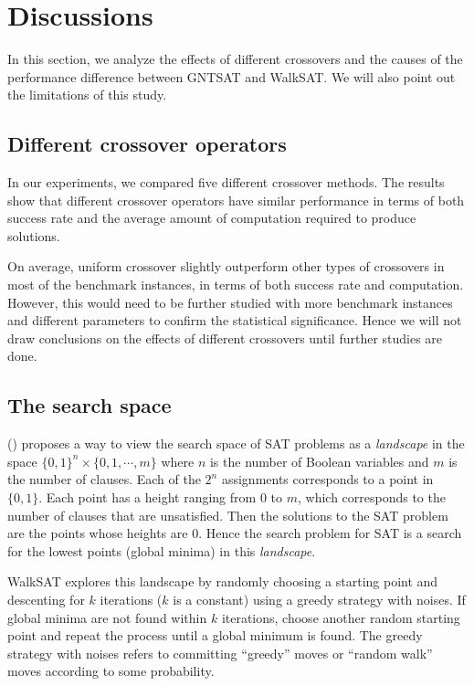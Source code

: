 \section{Discussions}
In this section, we analyze the effects of different crossovers and the causes
of the performance difference between GNTSAT and WalkSAT. We will also point
out the limitations of this study.

\subsection{Different crossover operators}
In our experiments, we compared five different crossover methods. The results
show that different crossover operators have similar performance in terms of
both success rate and the average amount of computation required to produce
solutions.

On average, uniform crossover slightly outperform other types of crossovers in
most of the benchmark instances, in terms of both success rate and
computation. However, this would need to be further studied with more
benchmark instances and different parameters to confirm the statistical
significance. Hence we will not draw conclusions on the effects of different
crossovers until further studies are done.

\subsection{The search space}
\citeauthor{biere2009handbook} (\citeyear{biere2009handbook}) proposes a way to view the search space of
SAT problems as a \textit{landscape} in the space $\{0, 1\}^n \times \{0,1,\cdots,m\}$
where $n$ is the number of Boolean variables and
$m$ is the number of clauses. Each of the
$2^n$ assignments corresponds to a point in
$\{0,1\}$. Each point has a height ranging from
$0$ to $m$, which corresponds to the
number of clauses that are unsatisfied. Then the solutions to the SAT problem
are the points whose heights are $0$. Hence the search
problem for SAT is a search for the lowest points (global minima) in this
\textit{landscape}.

WalkSAT explores this landscape by randomly choosing a starting point and
descenting for $k$ iterations ($k$ is a
constant) using a greedy strategy with noises. If global minima are not found
within $k$ iterations, choose another random starting point
and repeat the process until a global minimum is found. The greedy strategy
with noises refers to committing ``greedy'' moves or ``random walk'' moves
according to some probability.

